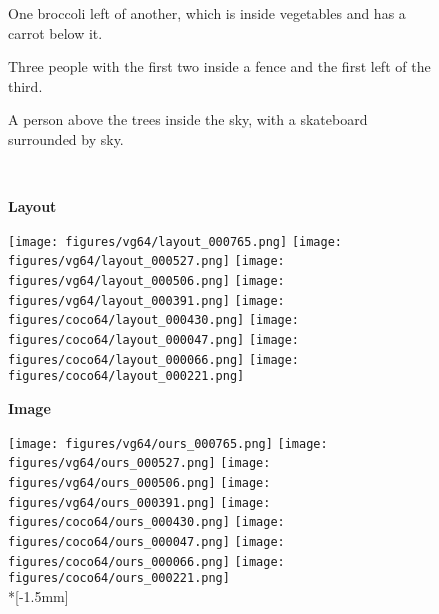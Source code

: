 \documentclass[10pt,twocolumn,letterpaper]{article}
\begin{document}
\begin{figure*}[ht!]
  \hspace{\qualtextspace}
  \begin{minipage}{\qualtext}
    \ssmall
    One broccoli left of another, which is inside vegetables
    and has a carrot below it.
  \end{minipage}
  \hspace{\qualtextspace}
  \begin{minipage}{\qualtext}
    \ssmall
    Three people with the first two inside a fence and the first
    left of the third.
  \end{minipage}
  \hspace{\qualtextspace}
  \begin{minipage}{\qualtext}
    \ssmall
    A person above the trees inside the sky, with a skateboard
    surrounded by sky.
  \end{minipage} \\
  \begin{rotate}{90}
    \hspace{4mm}
    \textbf{Layout}
  \end{rotate}
  \hspace*{0.5mm}
  \texttt{[image: figures/vg64/layout\_000765.png]}
  \texttt{[image: figures/vg64/layout\_000527.png]}
  \texttt{[image: figures/vg64/layout\_000506.png]}
  \texttt{[image: figures/vg64/layout\_000391.png]}
  \texttt{[image: figures/coco64/layout\_000430.png]}
  \texttt{[image: figures/coco64/layout\_000047.png]}
  \texttt{[image: figures/coco64/layout\_000066.png]}
  \texttt{[image: figures/coco64/layout\_000221.png]} \\
  \begin{rotate}{90}
    \hspace{6mm}\textbf{Image}
  \end{rotate}
  \hspace*{0.5mm}
  \texttt{[image: figures/vg64/ours\_000765.png]}
  \texttt{[image: figures/vg64/ours\_000527.png]}
  \texttt{[image: figures/vg64/ours\_000506.png]}
  \texttt{[image: figures/vg64/ours\_000391.png]}
  \texttt{[image: figures/coco64/ours\_000430.png]}
  \texttt{[image: figures/coco64/ours\_000047.png]}
  \texttt{[image: figures/coco64/ours\_000066.png]}
  \texttt{[image: figures/coco64/ours\_000221.png]} \\*[-1.5mm]

\end{figure*}
\end{document}
